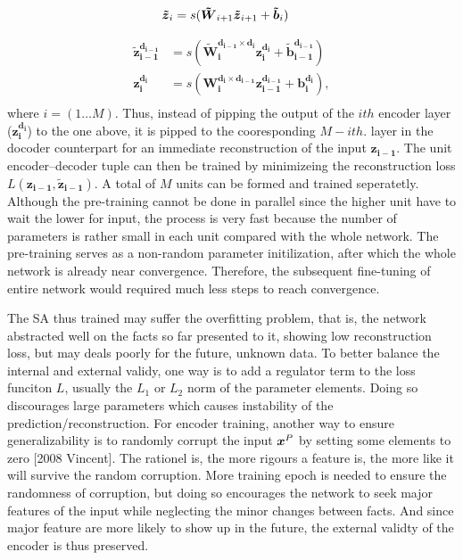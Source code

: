 \begin{equation*}
\begin{split}
  \boldsymbol{\tilde{z}}_i &= s(\boldsymbol{\tilde{W}}_{i+1} \boldsymbol{\tilde{z}}_{i+1} + \boldsymbol{\tilde{b}}_i)
\end{split}
\end{equation*}

\begin{equation} \label{eq:unit encoder-decoder}
\begin{split}
  \boldsymbol{\tilde{z}_{i-1}^{d_{i-1}}} &= s(\boldsymbol{\tilde{W}_{i  }^{d_{i-1} \times d_{i  }} z_{i  }^{d_{i  }}}+\boldsymbol{\tilde{b}_{i-1}^{d_{i-1}}}) \\
  \boldsymbol{z_{i  }^{d_{i  }}}         &= s(\boldsymbol{W_{i  }^{d_{i  } \times d_{i-1}} z_{i-1}^{d_{i-1}}}+\boldsymbol{b_{i  }^{d_{i  }}}), \\
\end{split}
\end{equation}
where $i=(1 \ldots M)$. Thus, instead of pipping the output of the $i th$ encoder layer ($\boldsymbol{z_{i  }^{d_{i  }}}$) to the one above, it is pipped to the cooresponding $M-i th.$ layer in the docoder counterpart for an immediate reconstruction of the input $\boldsymbol{z_{i-1}}$. The unit encoder--decoder tuple can then be trained by minimizeing the reconstruction loss $L(\boldsymbol{z_{i-1}},\boldsymbol{\tilde{z}_{i-1}})$. A total of $M$ units can be formed and trained seperatetly. Although the pre-training cannot be done in parallel since the higher unit have to wait the lower for input, the process is very fast because the number of parameters is rather small in each unit compared with the whole network. The pre-training serves as a non-random parameter initilization, after which the whole network is already near convergence. Therefore, the subsequent fine-tuning of entire network would required much less steps to reach convergence.

The SA thus trained may suffer the overfitting problem, that is, the network abstracted well on the facts so far presented to it, showing low reconstruction loss, but may deals poorly for the future, unknown data. To better balance the internal and external validy, one way is to add a regulator term to the loss funciton $L$, usually the $L_1$ or $L_2$ norm of the parameter elements. Doing so discourages large parameters which causes instability of the prediction/reconstruction. For encoder training, another way to ensure generalizability is to randomly corrupt the input $\boldsymbol{x}^P$ by setting some elements to zero [2008 Vincent]. The rationel is, the more rigours a feature is, the more like it will survive the random corruption. More training epoch is needed to ensure the randomness of corruption, but doing so encourages the network to seek major features of the input while neglecting the minor changes between facts. And since major feature are more likely to show up in the future, the external validty of the encoder is thus preserved.

